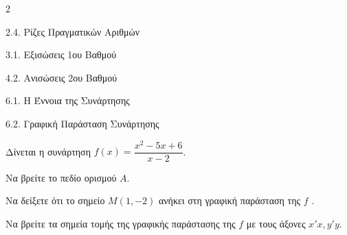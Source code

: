 \begin{ylh}{2}
    \item 2.4. Ρίζες Πραγματικών Αριθμών
    \item 3.1. Εξισώσεις 1ου Βαθμού
    \item 4.2. Ανισώσεις 2ου Βαθμού
    \item 6.1. Η Έννοια της Συνάρτησης
    \item 6.2. Γραφική Παράσταση Συνάρτησης
\end{ylh}
Δίνεται η συνάρτηση $f(x) = \dfrac{x^2-5x+6}{x-2}$.

\begin{alist}
\item Να βρείτε το πεδίο ορισμού $A$. 
\item Να δείξετε ότι το σημείο $M(1, -2)$ ανήκει στη γραφική παράσταση της $f$ . 
\item Να βρείτε τα σημεία τομής της γραφικής παράστασης της $f$ με τους άξονες $x'x, y'y$.

\end{alist}

